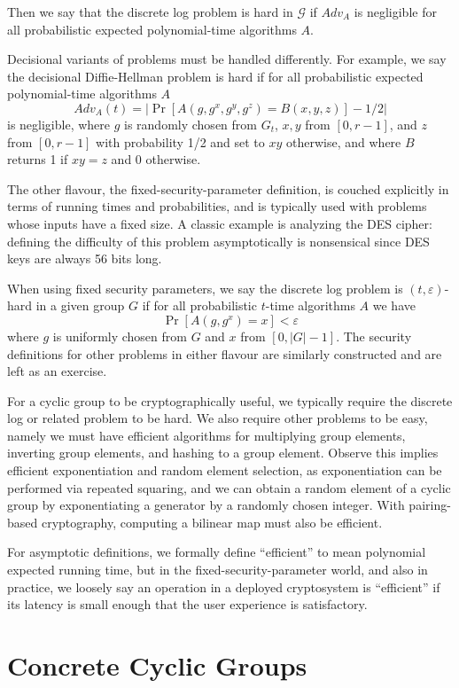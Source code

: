 Then we say that the discrete log problem is hard in $\mathcal G$ if $Adv_A$ is
negligible for all probabilistic expected polynomial-time algorithms $A$.

Decisional variants of problems must be handled differently.
For example, we say the decisional Diffie-Hellman problem is hard if
for all probabilistic expected polynomial-time algorithms $A$
\[
Adv_A(t) = | \Pr [ A(g, g^x, g^y, g^z) = B(x, y, z) ] - 1/2 |
\]
is negligible,
where $g$ is randomly chosen from $G_t$, $x, y$ from $[0,r-1]$, and
$z$ from $[0,r-1]$ with probability 1/2 and set to $x y$ otherwise,
and where $B$ returns 1 if $x y = z$ and 0 otherwise.

The other flavour, the fixed-security-parameter definition, is couched
explicitly in terms of running times and probabilities, and is typically used
with problems whose inputs have a fixed size. A classic example is analyzing the
DES cipher: defining the difficulty of this problem asymptotically is
nonsensical since DES keys are always 56 bits long.

When using fixed security parameters, we say the discrete
log problem is $(t, \varepsilon)$-hard in a given
group $G$ if for all probabilistic $t$-time algorithms $A$ we have
\[ \Pr [ A(g, g^x) = x ] < \varepsilon \]
where $g$ is uniformly chosen from $G$ and $x$ from $[0, |G| -1]$.
The security definitions for other problems in either flavour
are similarly constructed and are left as an exercise.

For a cyclic group to be cryptographically useful, we typically require the
discrete log or related problem to be hard. We also require other problems to
be easy, namely we must have efficient algorithms for multiplying group
elements, inverting group elements, and hashing to a group element. Observe
this implies efficient exponentiation and random element selection, as
exponentiation can be performed via repeated squaring, and we can obtain a
random element of a cyclic group by exponentiating a generator by a randomly
chosen integer. With pairing-based cryptography, computing a bilinear map must
also be efficient.

For asymptotic definitions, we formally define ``efficient'' to mean polynomial
expected running time, but in the fixed-security-parameter world, and also in
practice, we loosely say an operation in a deployed cryptosystem is
``efficient'' if its latency is small enough that the user experience is
satisfactory.

\section{Concrete Cyclic Groups}

